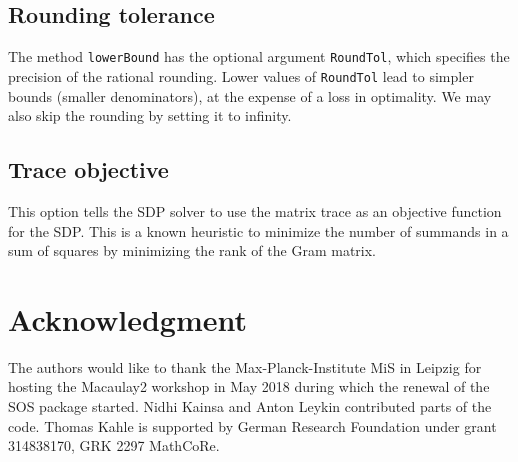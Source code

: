 \documentclass[11pt]{amsart}
\theoremstyle{plain}%
\theoremstyle{definition}
\theoremstyle{remark}
\newcommand{\Mac}{Macaulay2\xspace}
\begin{document}
\subsection*{Rounding tolerance}
The method \verb|lowerBound| has the optional argument \verb|RoundTol|, which specifies the precision of the rational rounding.
Lower values of \verb|RoundTol| lead to simpler bounds (smaller denominators), at the expense of a loss in optimality.
We may also skip the rounding by setting it to infinity.

\subsection*{Trace objective}
This option tells the SDP solver to use the matrix trace as an objective function for the SDP.
This is a known heuristic to minimize the number of summands in a sum of squares by minimizing the rank of the Gram matrix.


\section*{Acknowledgment}
\label{sec:acknowledgement}
The authors would like to thank the Max-Planck-Institute MiS in Leipzig for hosting the \Mac workshop in May 2018 during which the renewal of the SOS package started.
Nidhi Kainsa and Anton Leykin contributed parts of the code.
Thomas Kahle is supported by German Research Foundation under grant 314838170, GRK 2297 MathCoRe.



\end{document}
